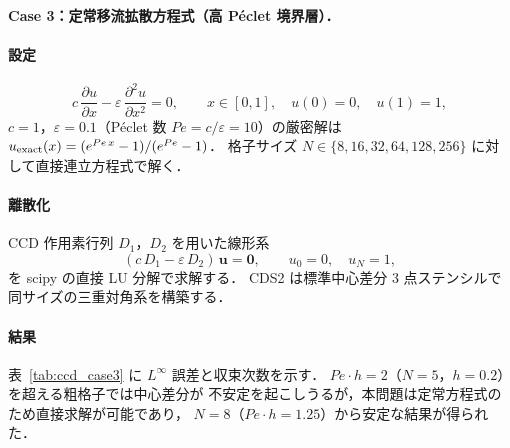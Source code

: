 \paragraph{Case 3：定常移流拡散方程式（高 Péclet 境界層）．}\label{app:ccd_case3}

\paragraph{設定}
\begin{equation}
  c\,\frac{\partial u}{\partial x} - \varepsilon\,\frac{\partial^2 u}{\partial x^2} = 0,
  \qquad x \in [0,1],\quad u(0)=0,\quad u(1)=1,
  \label{eq:ccd_advdiff}
\end{equation}
$c=1$，$\varepsilon = 0.1$（Péclet 数 $Pe = c/\varepsilon = 10$）の厳密解は
$u_{\rm exact}(x) = (e^{Pe\,x} - 1)/(e^{Pe} - 1)$．
格子サイズ $N \in \{8, 16, 32, 64, 128, 256\}$ に対して直接連立方程式で解く．

\paragraph{離散化}
CCD 作用素行列 $D_1$，$D_2$ を用いた線形系
\begin{equation}
  (c\,D_1 - \varepsilon\,D_2)\,\mathbf{u} = \mathbf{0},
  \qquad u_0 = 0,\quad u_N = 1,
  \label{eq:ccd_advdiff_sys}
\end{equation}
を scipy の直接 LU 分解で求解する．
CDS2 は標準中心差分 3 点ステンシルで同サイズの三重対角系を構築する．

\paragraph{結果}
表~\ref{tab:ccd_case3} に $L^\infty$ 誤差と収束次数を示す．
$Pe \cdot h = 2$（$N=5$，$h=0.2$）を超える粗格子では中心差分が
不安定を起こしうるが，本問題は定常方程式のため直接求解が可能であり，
$N=8$（$Pe \cdot h = 1.25$）から安定な結果が得られた．

